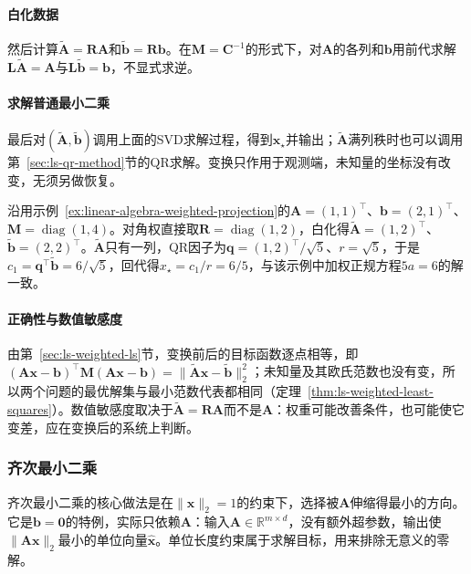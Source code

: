 \paragraph{白化数据}
然后计算$\widetilde{\bm A}=\bm R\bm A$和$\widetilde{\bm b}=\bm R\bm b$。在$\bm M=\bm C^{-1}$的形式下，对$\bm A$的各列和$\bm b$用前代求解$\bm L\widetilde{\bm A}=\bm A$与$\bm L\widetilde{\bm b}=\bm b$，不显式求逆。

\paragraph{求解普通最小二乘}
最后对$(\widetilde{\bm A},\widetilde{\bm b})$调用上面的SVD求解过程，得到$\bm x_\star$并输出；$\widetilde{\bm A}$满列秩时也可以调用第~\ref{sec:ls-qr-method}节的QR求解。变换只作用于观测端，未知量的坐标没有改变，无须另做恢复。

\begin{example}[两种权重下的白化求解]
\label{ex:ls-weighted-whitening-solve}
沿用示例~\ref{ex:linear-algebra-weighted-projection}的$\bm A=(1,1)^\top$、$\bm b=(2,1)^\top$、$\bm M=\operatorname{diag}(1,4)$。对角权直接取$\bm R=\operatorname{diag}(1,2)$，白化得$\widetilde{\bm A}=(1,2)^\top$、$\widetilde{\bm b}=(2,2)^\top$。$\widetilde{\bm A}$只有一列，QR因子为$\bm q=(1,2)^\top/\sqrt5$、$r=\sqrt5$，于是$c_1=\bm q^\top\widetilde{\bm b}=6/\sqrt5$，回代得$x_\star=c_1/r=6/5$，与该示例中加权正规方程$5a=6$的解一致。
\end{example}

\paragraph{正确性与数值敏感度}
由第~\ref{sec:ls-weighted-ls}节，变换前后的目标函数逐点相等，即$(\bm A\bm x-\bm b)^\top\bm M(\bm A\bm x-\bm b)=\lVert\widetilde{\bm A}\bm x-\widetilde{\bm b}\rVert_2^2$；未知量及其欧氏范数也没有变，所以两个问题的最优解集与最小范数代表都相同（定理~\ref{thm:ls-weighted-least-squares}）。数值敏感度取决于$\widetilde{\bm A}=\bm R\bm A$而不是$\bm A$：权重可能改善条件，也可能使它变差，应在变换后的系统上判断。

\subsubsection{齐次最小二乘}

齐次最小二乘的核心做法是在$\lVert\bm x\rVert_2=1$的约束下，选择被$\bm A$伸缩得最小的方向。它是$\bm b=\bm0$的特例，实际只依赖$\bm A$：输入$\bm A\in\mathbb R^{m\times d}$，没有额外超参数，输出使$\lVert\bm A\bm x\rVert_2$最小的单位向量$\hat{\bm x}$。单位长度约束属于求解目标，用来排除无意义的零解。


